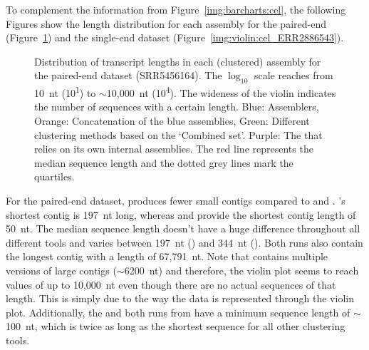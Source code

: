 \documentclass[12pt,a4paper,english]{article}
\begin{document}
    To complement the information from Figure~\ref{img:barcharts:cel}, the following Figures show the length distribution for each assembly for the paired-end (Figure~\ref{img:violin:cel_SRR5456164}) and the single-end dataset (Figure~\ref{img:violin:cel_ERR2886543}).
    		\begin{figure}[H]
    	\centering
    	\def\svgwidth{\textwidth}
    	
    	\caption[Distribution of transcript lengths per assembly (PE, SRR5456164)]{Distribution of transcript lengths in each (clustered) assembly for the paired-end \celegans dataset (SRR5456164). The $\log_{10}$ scale reaches from 10~nt (10\textsuperscript{1}) to $\sim$10,000~nt (10\textsuperscript{4}). The wideness of the violin indicates the number of sequences with a certain length. Blue: Assemblers, Orange: Concatenation of the blue assemblies, Green: Different clustering methods based on the `Combined set'. Purple: The \orp that relies on its own internal assemblies. The red line represents the median sequence length and the dotted grey lines mark the quartiles.}
    	\label{img:violin:cel_SRR5456164}
    \end{figure}
	For the paired-end dataset, \trinity produces fewer small contigs compared to \soap and \spades. \trinity's shortest contig is 197~nt long, whereas \spades and \soap provide the shortest contig length of 50~nt.
	The median sequence length doesn't have a huge difference throughout all different tools and varies between 197~nt (\mclust) and 344~nt (\grouper). Both \grouper runs also contain the longest contig with a length of 67,791~nt.
	Note that \grouper contains multiple versions of large contigs ($\sim$6200~nt) and therefore, the violin plot seems to reach values of up to 10,000~nt even though there are no actual sequences of that length. This is simply due to the way the data is represented through the violin plot.
	Additionally, the \orp and both runs from \grouper have a minimum sequence length of $\sim$100~nt, which is twice as long as the shortest sequence for all other clustering tools.
\end{document}
